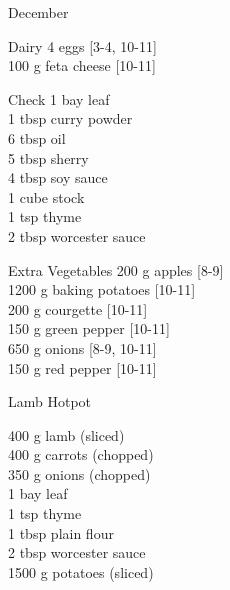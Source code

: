 \begin{menu}{December}
\begin{shoppinglist}{Dairy}
      4  eggs {\scriptsize[3-4, 10-11]}\\
      100 g feta cheese {\scriptsize[10-11]}\\
      \end{shoppinglist}%
      \par\vfil %
      \vfil\clearpage %
      \begin{shoppinglist}{Check}
      1  bay leaf \\
      1 tbsp curry powder \\
      6 tbsp oil \\
      5 tbsp sherry \\
      4 tbsp soy sauce \\
      1 cube stock \\
      1 tsp thyme \\
      2 tbsp worcester sauce \\
      \end{shoppinglist}%
      \begin{shoppinglist}{Extra Vegetables}
      200 g apples {\scriptsize[8-9]}\\
      1200 g baking potatoes {\scriptsize[10-11]}\\
      200 g courgette {\scriptsize[10-11]}\\
      150 g green pepper {\scriptsize[10-11]}\\
      650 g onions {\scriptsize[8-9, 10-11]}\\
      150 g red pepper {\scriptsize[10-11]}\\
      \end{shoppinglist}%
      \par\vfil %
    \vfil\clearpage
  
    \begin{recipe}{2}{Lamb Hotpot}%
		\begin{ingredients}
		400 g lamb (sliced) \\
	400 g carrots (chopped) \\
	350 g onions (chopped) \\
	1  bay leaf  \\
	1 tsp thyme  \\
	1 tbsp plain flour  \\
	2 tbsp worcester sauce  \\
	1500 g potatoes (sliced) \\
	

\end{ingredients}
\end{recipe}
\end{menu}
